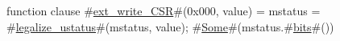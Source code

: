 function clause #\hyperref[sailRISCVzextzywritezyCSR]{ext\_write\_CSR}#(0x000, value) = { mstatus = #\hyperref[sailRISCVzlegalizzezyustatus]{legalize\_ustatus}#(mstatus, value); #\hyperref[sailRISCVzSome]{Some}#(mstatus.#\hyperref[sailRISCVzbits]{bits}#()) }
